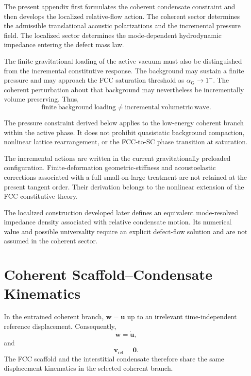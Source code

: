 The present appendix first formulates the coherent condensate constraint and then develops the localized relative-flow action. The coherent sector determines the admissible translational acoustic polarizations and the incremental pressure field. The localized sector determines the mode-dependent hydrodynamic impedance entering the defect mass law.

The finite gravitational loading of the active vacuum must also be distinguished from the incremental constitutive response. The background may sustain a finite pressure and may approach the FCC saturation threshold as $\alpha_{\mathrm{G}} \rightarrow 1^{-}$. The coherent perturbation about that background may nevertheless be incrementally volume preserving. Thus,
\begin{equation}
    \mathrm{finite\ background\ loading} \neq \mathrm{incremental\ volumetric\ wave}.
\end{equation}

The pressure constraint derived below applies to the low-energy coherent branch within the active phase. It does not prohibit quasistatic background compaction, nonlinear lattice rearrangement, or the FCC-to-SC phase transition at saturation.

The incremental actions are written in the current gravitationally preloaded configuration. Finite-deformation geometric-stiffness and acoustoelastic corrections associated with a full small-on-large treatment are not retained at the present tangent order. Their derivation belongs to the nonlinear extension of the FCC constitutive theory.

The localized construction developed later defines an equivalent mode-resolved impedance density associated with relative condensate motion. Its numerical value and possible universality require an explicit defect-flow solution and are not assumed in the coherent sector.

\section{Coherent Scaffold--Condensate Kinematics}
\label{sec:AP_coherent_kinematics}

In the entrained coherent branch, $\mathbf{w} = \mathbf{u}$ up to an irrelevant time-independent reference displacement. Consequently,
\begin{equation}
    \dot{\mathbf{w}} = \dot{\mathbf{u}},
\end{equation}
and
\begin{equation}
    \mathbf{v}_{\mathrm{rel}} = \mathbf{0}.
\end{equation}
The FCC scaffold and the interstitial condensate therefore share the same displacement kinematics in the selected coherent branch.

